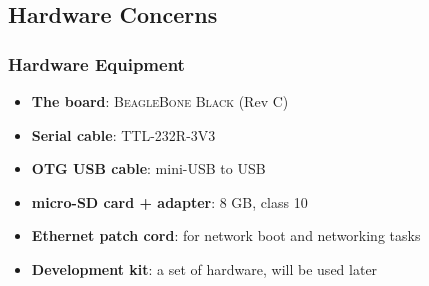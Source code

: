 \documentclass[aspectratio=169]{beamer}
\begin{document}
\subsection{Hardware Concerns}

\begin{frame}
  \frametitle{Hardware Equipment}
  \begin{itemize}
    \item \textbf{The board}: \textsc{BeagleBone Black} (Rev C)
    \item \textbf{Serial cable}: TTL-232R-3V3
    \item \textbf{OTG USB cable}: mini-USB to USB
    \item \textbf{micro-SD card + adapter}: 8 GB, class 10
    \item \textbf{Ethernet patch cord}: for network boot and networking tasks
    \item \textbf{Development kit}: a set of hardware, will be used later
  \end{itemize}
\end{frame}
\end{document}

